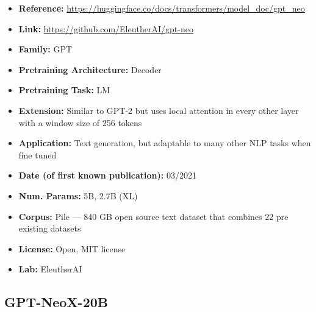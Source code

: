 \documentclass{article}
\begin{document}
            \begin{itemize}
                \item \textbf{Reference:} \url{https://huggingface.co/docs/transformers/model_doc/gpt_neo}
                \item \textbf{Link:} \url{https://github.com/EleutherAI/gpt-neo}
                \item \textbf{Family:} GPT 
                \item \textbf{Pretraining Architecture:} Decoder
                \item \textbf{Pretraining Task:} LM
                \item \textbf{Extension:} Similar to GPT-2 but uses local attention in every other layer with a window size of 256 tokens  
                \item \textbf{Application:} Text generation, but adaptable to many other NLP tasks when fine tuned
                \item \textbf{Date (of first known publication):} 03/2021
                \item \textbf{Num. Params:} 5B, 2.7B (XL)
                \item \textbf{Corpus:} Pile — 840 GB open source text dataset that combines 22 pre existing datasets
                \item \textbf{License:} Open, MIT license
                \item \textbf{Lab:} EleutherAI
            \end{itemize}
 
\subsection{GPT-NeoX-20B}
\end{document}
